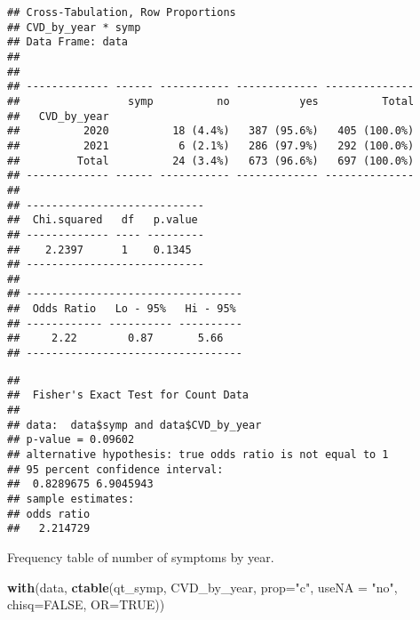 \documentclass[
]{article}
\newenvironment{Shaded}{\begin{snugshade}}{\end{snugshade}}
\newcommand{\AttributeTok}[1]{\textcolor[rgb]{0.13,0.29,0.53}{#1}}
\newcommand{\ConstantTok}[1]{\textcolor[rgb]{0.56,0.35,0.01}{#1}}
\newcommand{\FunctionTok}[1]{\textcolor[rgb]{0.13,0.29,0.53}{\textbf{#1}}}
\newcommand{\NormalTok}[1]{#1}
\newcommand{\SpecialCharTok}[1]{\textcolor[rgb]{0.81,0.36,0.00}{\textbf{#1}}}
\newcommand{\StringTok}[1]{\textcolor[rgb]{0.31,0.60,0.02}{#1}}
\begin{document}
\begin{verbatim}
## Cross-Tabulation, Row Proportions  
## CVD_by_year * symp  
## Data Frame: data  
## 
## 
## ------------- ------ ----------- ------------- --------------
##                 symp          no           yes          Total
##   CVD_by_year                                                
##          2020          18 (4.4%)   387 (95.6%)   405 (100.0%)
##          2021           6 (2.1%)   286 (97.9%)   292 (100.0%)
##         Total          24 (3.4%)   673 (96.6%)   697 (100.0%)
## ------------- ------ ----------- ------------- --------------
## 
## ----------------------------
##  Chi.squared   df   p.value 
## ------------- ---- ---------
##    2.2397      1    0.1345  
## ----------------------------
## 
## ----------------------------------
##  Odds Ratio   Lo - 95%   Hi - 95% 
## ------------ ---------- ----------
##     2.22        0.87       5.66   
## ----------------------------------
\end{verbatim}

\begin{Shaded}
\end{Shaded}

\begin{verbatim}
## 
##  Fisher's Exact Test for Count Data
## 
## data:  data$symp and data$CVD_by_year
## p-value = 0.09602
## alternative hypothesis: true odds ratio is not equal to 1
## 95 percent confidence interval:
##  0.8289675 6.9045943
## sample estimates:
## odds ratio 
##   2.214729
\end{verbatim}

Frequency table of number of symptoms by year.

\begin{Shaded}
\begin{Highlighting}[]
\FunctionTok{with}\NormalTok{(data, }\FunctionTok{ctable}\NormalTok{(qt\_symp, CVD\_by\_year, }\AttributeTok{prop=}\StringTok{"c"}\NormalTok{, }\AttributeTok{useNA =} \StringTok{"no"}\NormalTok{, }\AttributeTok{chisq=}\ConstantTok{FALSE}\NormalTok{, }\AttributeTok{OR=}\ConstantTok{TRUE}\NormalTok{))}
\end{Highlighting}
\end{Shaded}
\end{document}
